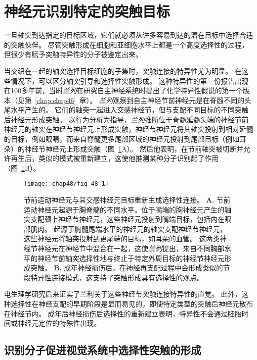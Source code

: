 \section{神经元识别特定的突触目标}

一旦轴突到达指定的目标区域，它们就必须从许多容易到达的潜在目标中选择合适的突触伙伴。
尽管突触形成在细胞和亚细胞水平上都是一个高度选择性的过程，但很少有赋予突触特异性的分子被鉴定出来。


当交织在一起的轴突选择目标细胞的子集时，突触连接的特异性尤为明显。
在这些情况下，可以区分轴突引导和选择性突触形成。
这种特异性的第一份报告出现在100多年前，当时\textit{兰列}在研究自主神经系统时提出了化学特异性假说的第一个版本（见第~\ref{chap:chap46}~章）。
\textit{兰列}观察到自主神经节前神经元是在脊髓不同的头尾水平产生的。
它们的轴突一起进入交感神经节，但与支配不同目标的不同突触后神经元形成突触。
以行为分析为指导，\textit{兰列}推断位于脊髓延髓头端的神经节前神经元的轴突在神经节神经元上形成突触，神经节神经元将其轴突投射到相对延髓的目标，例如眼睛，而来自脊髓更多尾部区域的神经元投射到尾部目标（例如耳朵）的神经节神经元上形成突触（图~\ref{fig:48_1}A）。
然后他表明，在节前轴突被切断并允许再生后，类似的模式被重新建立，这使他推测某种分子识别起了作用（图~\ref{fig:48_1}B）。


\begin{figure}[htbp]
	\centering
	\texttt{[image: chap48/fig\_48\_1]}
	\caption{节前运动神经元与其交感神经元目标重新生成选择性连接。
		\textbf{A.} 节前运动神经元起源于胸脊髓的不同水平。位于嘴端的胸神经元产生的轴突支配颈上神经节神经元，这些神经元投射到嘴端目标，包括内在眼部肌肉。
		起源于胸髓尾端水平的神经元的轴突支配神经节神经元，这些神经元将轴突投射到更尾端的目标，如耳朵的血管。
		这两类神经节神经元在神经节中混合在一起，这使\textit{兰列}提出，来自不同胸部水平的神经节前轴突选择性地与终止于特定外周目标的神经节神经元形成突触。
		\textbf{B.} 成年神经损伤后，在神经再支配过程中会形成类似的节段特异性连接模式，这支持了突触形成具有选择性的观点\cite{njaa1977specific}。}
	\label{fig:48_1}
\end{figure}


电生理学研究后来证实了兰利关于这些神经节突触连接特异性的直觉。
此外，这种选择性在神经支配的早期阶段是显而易见的，即使特定类型的突触后神经元散布在神经节内。
成年后神经损伤后选择性的重新建立表明，特异性不会通过胚胎时间或神经元定位的特殊性出现。



\subsection{识别分子促进视觉系统中选择性突触的形成}

